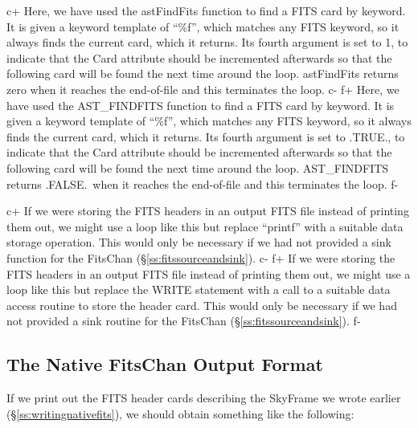 \documentclass[twoside,11pt]{article}
\newcommand{\secref}[1]{\S\ref{#1}}
\newcommand{\secref}[1]{\ref{#1}}
\begin{document}
c+
Here, we have used the astFindFits function to find a FITS card by
keyword. It is given a keyword template of ``\%f'', which matches any
FITS keyword, so it always finds the current card, which it
returns. Its fourth argument is set to 1, to indicate that the Card
attribute should be incremented afterwards so that the following card
will be found the next time around the loop. astFindFits returns zero
when it reaches the end-of-file and this terminates the loop.
c-
f+
Here, we have used the AST\_FINDFITS function to find a FITS card by
keyword. It is given a keyword template of ``\%f'', which matches any
FITS keyword, so it always finds the current card, which it
returns. Its fourth argument is set to .TRUE., to indicate that the
Card attribute should be incremented afterwards so that the following
card will be found the next time around the loop. AST\_FINDFITS
returns .FALSE.\ when it reaches the end-of-file and this terminates
the loop.
f-

c+
If we were storing the FITS headers in an output FITS file instead of
printing them out, we might use a loop like this but replace
``printf'' with a suitable data storage operation. This would only be
necessary if we had not provided a sink function for the FitsChan
(\secref{ss:fitssourceandsink}).
c-
f+
If we were storing the FITS headers in an output FITS file instead of
printing them out, we might use a loop like this but replace the WRITE
statement with a call to a suitable data access routine to store the
header card. This would only be necessary if we had not provided a
sink routine for the FitsChan (\secref{ss:fitssourceandsink}).
f-

\subsection{The Native FitsChan Output Format}

If we print out the FITS header cards describing the SkyFrame we wrote
earlier (\secref{ss:writingnativefits}), we should obtain something
like the following:
\end{document}
